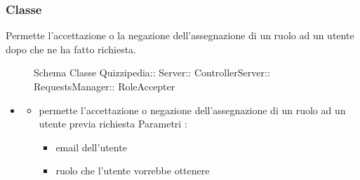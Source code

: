 \subsubsection{Classe }
Permette l'accettazione o la negazione dell'assegnazione di un ruolo ad un utente dopo che ne ha fatto richiesta.
\begin{figure}[H]
\centering
\noindent{}
\caption[Schema Classe RoleAccepter]{Schema Classe Quizzipedia:: Server:: ControllerServer:: RequestsManager:: RoleAccepter}
\end{figure}
\begin{itemize}
\item {}
\begin{itemize}
\item {}
\newline
permette l'accettazione o negazione dell'assegnazione di un ruolo ad un utente previa richiesta
\newline
Parametri :
\begin{itemize}
\item {}
\newline
email dell'utente
\item {}
\newline
ruolo che l'utente vorrebbe ottenere
\end{itemize}
\end{itemize}
\end{itemize}
